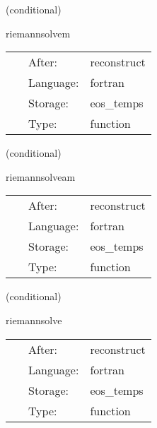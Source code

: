 \documentclass{article}
\begin{document}
\vspace{5mm}

   (conditional) 

\hspace{5mm} riemannsolvem 

\hspace{5mm}{\it solve the local riemann problems - mhd version } 


\hspace{5mm}

 \begin{tabular*}{160mm}{cll} 
~ & After:  & reconstruct \\ 
~ & Language:  & fortran \\ 
~ & Storage:  & eos\_temps \\ 
~ & Type:  & function \\ 
\end{tabular*} 


\vspace{5mm}

   (conditional) 

\hspace{5mm} riemannsolveam 

\hspace{5mm}{\it solve the local riemann problems - vector potential mhd version } 


\hspace{5mm}

 \begin{tabular*}{160mm}{cll} 
~ & After:  & reconstruct \\ 
~ & Language:  & fortran \\ 
~ & Storage:  & eos\_temps \\ 
~ & Type:  & function \\ 
\end{tabular*} 


\vspace{5mm}

   (conditional) 

\hspace{5mm} riemannsolve 

\hspace{5mm}{\it solve the local riemann problems } 


\hspace{5mm}

 \begin{tabular*}{160mm}{cll} 
~ & After:  & reconstruct \\ 
~ & Language:  & fortran \\ 
~ & Storage:  & eos\_temps \\ 
~ & Type:  & function \\ 
\end{tabular*} 
\end{document}
